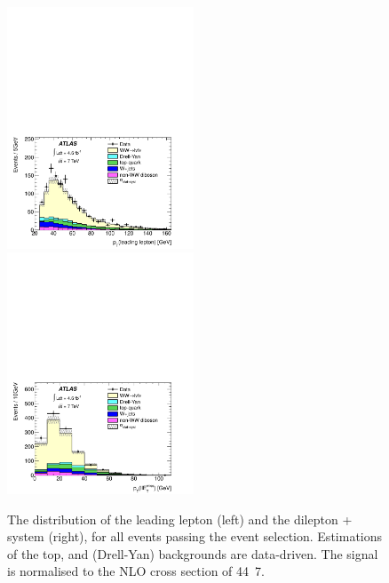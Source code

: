 \begin{figure}
	\includegraphics[width=0.495\textwidth]{tex/ww/pt_leadlep}
	\hfill
	\includegraphics[width=0.495\textwidth]{tex/ww/pt_tot}
	\caption{The \pt distribution of the leading lepton (left) and the dilepton + \met 
	system (right), for all events passing the \WW event selection. Estimations of the 
	top, \Wjets and \DY (Drell-Yan) backgrounds are data-driven. The \WW signal is 
	normalised to the NLO cross section of \unit{44.7}{\pico\barn}.}
	\label{fig:ww:sr_distributions}
\end{figure}

